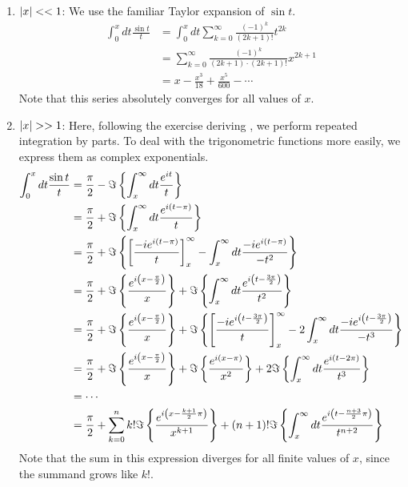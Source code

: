 \item

\begin{enumerate}[wide, labelindent = 0pt, label = (\roman*)]
\item $\left| x \right| << 1$:
We use the familiar Taylor expansion of $\sin t$.
\begin{align*}
    \int_0^x dt \frac{\sin t}{t}
    &= \int_0^x dt \sum_{k=0}^\infty \frac{{(-1)}^k}{(2k + 1)!} t^{2k} \\
    &= \sum_{k=0}^\infty \frac{{(-1)}^k}{(2k + 1) \cdot (2k + 1)!} x^{2k + 1} \\
    &= x - \frac{x^3}{18} + \frac{x^5}{600} - \cdots
\end{align*}
Note that this series absolutely converges for all values of $x$.

\item $\left| x \right| >> 1$:
Here, following the exercise deriving , we perform repeated integration by parts.
To deal with the trigonometric functions more easily, we express them as complex exponentials.
\begin{align*}
    \int_0^x dt \frac{\sin t}{t}
    &= \frac{\pi}{2} - \Im\left\{ \int_x^\infty dt \frac{e^{it}}{t} \right\} \\
    &= \frac{\pi}{2} + \Im\left\{ \int_x^\infty dt \frac{e^{i(t - \pi)}}{t} \right\} \\
    &= \frac{\pi}{2} + \Im\left\{
        {\left[ \frac{-ie^{i(t - \pi)}}{t} \right]_{x}^{\infty}}
        - \int_x^\infty dt \frac{-ie^{i(t - \pi)}}{-t^2}
    \right\} \\
    &= \frac{\pi}{2} + \Im\left\{ \frac{e^{i\left( x - \frac{\pi}{2} \right)}}{x} \right\}
     + \Im\left\{ \int_x^\infty dt \frac{e^{i\left( t - \frac{3\pi}{2} \right)}}{t^2} \right\} \\
    &= \frac{\pi}{2} + \Im\left\{ \frac{e^{i\left( x - \frac{\pi}{2} \right)}}{x} \right\}
     + \Im\left\{
         {\left[ \frac{-ie^{i\left( t - \frac{3\pi}{2} \right)}}{t} \right]_{x}^{\infty}}
         - 2\int_x^\infty dt \frac{-ie^{i\left( t - \frac{3\pi}{2} \right)}}{-t^3}
    \right\} \\
    &= \frac{\pi}{2} + \Im\left\{ \frac{e^{i\left( x - \frac{\pi}{2} \right)}}{x} \right\} + \Im\left\{ \frac{e^{i(x - \pi)}}{x^2} \right\}
     + 2\Im\left\{ \int_x^\infty dt \frac{e^{i( t - 2\pi)}}{t^3} \right\} \\
    &= \cdots \\
    &= \frac{\pi}{2}
     + \sum_{k=0}^n k! \Im\left\{ \frac{e^{i\left( x - \frac{k + 1}{2}\pi \right)}}{x^{k + 1}} \right\}
     + (n + 1)! \Im\left\{ \int_x^\infty dt \frac{e^{i\left( t - \frac{n + 3}{2}\pi \right)}}{t^{n + 2}} \right\}
\end{align*}
Note that the sum in this expression diverges for all finite values of $x$, since the summand grows like $k!$.

\end{enumerate}
